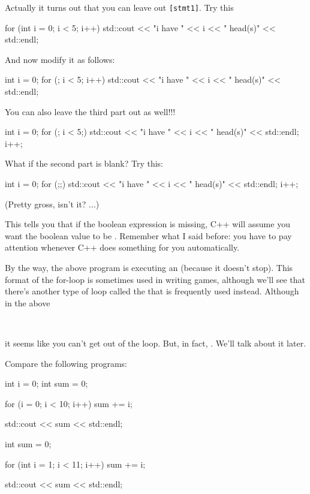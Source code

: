 Actually it turns out that you can leave out \texttt{[stmt1]}. Try this
\begin{console}
for (int i = 0; i < 5; i++)
{   
    std::cout << "i have " << i
              << " head(s)"
              << std::endl;
}
\end{console}
And now modify it as follows:
\begin{console}
int i = 0;
for (; i < 5; i++)
{   
    std::cout << "i have " << i
              << " head(s)"
              << std::endl;
}
\end{console}
You can also leave the third part out as well!!!
\begin{console}
int i = 0;
for (; i < 5;)
{   
    std::cout << "i have " << i
              << " head(s)"
              << std::endl;
    i++;
}
\end{console}
What if the second part is blank? Try this:
\begin{console}
int i = 0;
for (;;)
{   
    std::cout << "i have " << i
              << " head(s)"
              << std::endl;
    i++;
}
\end{console}
(Pretty gross, isn't it? ...)

This tells you that if the boolean expression is missing, C++ will
assume you want the boolean value to be . Remember
what I said before: you have to pay attention whenever C++ does
something for you automatically.

By the way, the above program is executing an 
(because it doesn't stop). This format of the for-loop is sometimes used in writing games, although we'll see that there's another type of loop called the
 that is frequently used instead. Although in the above

\\

it seems like you can't get out of the loop. But, in fact, . We'll talk
about it later.

\newpage{}

Compare the following programs:
\begin{console}
int i = 0;
int sum = 0;

for (i = 0; i < 10; i++)
{   
    sum += i;
}

std::cout << sum << std::endl;
\end{console}

\begin{console}
int sum = 0;

for (int i = 1; i < 11; i++)
{   
    sum += i;
}

std::cout << sum << std::endl;
\end{console}

